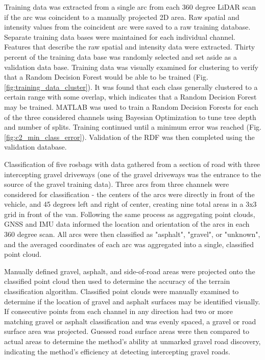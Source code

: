 \documentclass[balance,upint,subscriptcorrection,varvw,mathalfa=cal=boondoxo,colorlinks]{asmeconf}
\begin{document}
	{Training data was extracted from a single arc from each 360 degree LiDAR scan if the arc was coincident to a manually projected 2D area. Raw spatial and intensity values from the coincident arc were saved to a raw training database. Separate training data bases were maintained for each individual channel. Features that describe the raw spatial and intensity data were extracted. Thirty percent of the training data base was randomly selected and set aside as a validation data base. Training data was visually examined for clustering to verify that a Random Decision Forest would be able to be trained (Fig. \ref{fig:training_data_cluster}). It was found that each class generally clustered to a certain range with some overlap, which indicates that a Random Decision Forest may be trained. MATLAB was used to train a Random Decision Forests for each of the three considered channels using Bayesian Optimization to tune tree depth and number of splits. Training continued until a minimum error was reached (Fig. \ref{fig:c2_min_class_error}). Validation of the RDF was then completed using the validation database.}

	{Classification of five rosbags with data gathered from a section of road with three intercepting gravel driveways (one of the gravel driveways was the entrance to the source of the gravel training data). Three arcs from three channels were considered for classification - the centers of the arcs were directly in front of the vehicle, and 45 degrees left and right of center, creating nine total areas in a 3x3 grid in front of the van. Following the same process as aggregating point clouds, GNSS and IMU data informed the location and orientation of the arcs in each 360 degree scan. All arcs were then classified as "asphalt", "gravel", or "unknown", and the averaged coordinates of each arc was aggregated into a single, classified point cloud.}
	
	{Manually defined gravel, asphalt, and side-of-road areas were projected onto the classified point cloud then used to determine the accuracy of the terrain classification algorithm. Classified point clouds were manually examined to determine if the location of gravel and asphalt surfaces may be identified visually. If consecutive points from each channel in any direction had two or more matching gravel or asphalt classification and was evenly spaced, a gravel or road surface area was projected. Guessed road surface areas were then compared to actual areas to determine the method's ability at unmarked gravel road discovery, indicating the method's efficiency at detecting intercepting gravel roads.}
		
\end{document}
